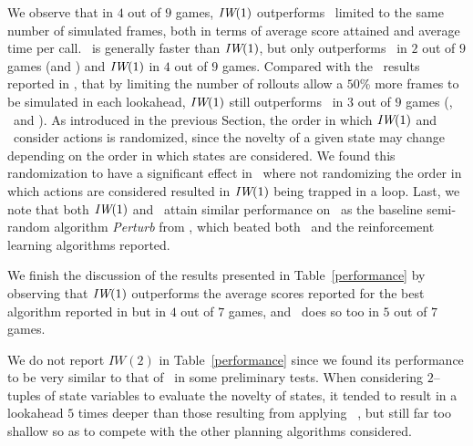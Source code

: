 We observe that in $4$ out of $9$ games, ${\textit{IW}}(1)$ outperforms \UCT~limited to the same number
of simulated frames, both in terms of average score attained and average time per call. \BFS~is
generally faster than ${\textit{IW}}(1)$, but only outperforms \UCT~in $2$ out of $9$ games (\Freeway and
\Seaquest) and ${\textit{IW}}(1)$ in $4$ out of $9$ games. Compared with the \UCT~results reported
in \cite{bellemare:jair2013}, that by limiting the number of rollouts allow a $50$\% more frames
to be simulated in each lookahead, ${\textit{IW}}(1)$ still outperforms \UCT~in $3$ out of $9$ games
(\Breakout, \Enduro~and \Freeway). As introduced in the previous Section, the order in which
${\textit{IW}}(1)$ and \BFS~consider actions is randomized, since the novelty of a given state may
change depending on the order in which states are considered. We found this randomization to
have a significant effect in \Qbert~where not randomizing the order in which actions are considered
resulted in ${\textit{IW}}(1)$ being trapped in a loop. Last, we note that both ${\textit{IW}}(1)$ and \BFS~attain similar 
performance on \Freeway~as the baseline semi-random algorithm \emph{Perturb} 
from \cite{bellemare:jair2013}, which beated both \UCT~and the reinforcement learning algorithms reported.

We finish the discussion of the results presented in Table~\ref{performance} by observing
that ${\textit{IW}}(1)$ outperforms the average scores reported for the best algorithm reported in
\cite{deep-mind-atari} but in $4$ out of $7$ games, and \BFS~does so too in $5$ out of $7$
games.

We do not report $IW(2)$ in Table~\ref{performance} since we found its performance to
be very similar to that of \BRFS~in some preliminary tests. When considering $2$--tuples
of state variables to evaluate the novelty of states, it tended to result in a lookahead
$5$ times deeper than those resulting from applying \BRFS~, but still far too shallow so
as to compete with the other planning algorithms considered.

